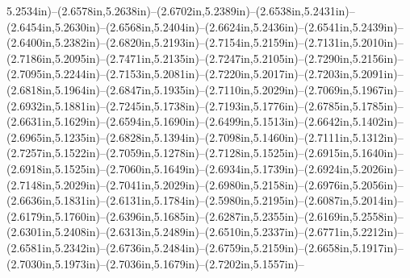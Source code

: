 5.2534in)--(2.6578in,5.2638in)--(2.6702in,5.2389in)--(2.6538in,5.2431in)--(2.6454in,5.2630in)--(2.6568in,5.2404in)--(2.6624in,5.2436in)--(2.6541in,5.2439in)--(2.6400in,5.2382in)--(2.6820in,5.2193in)--(2.7154in,5.2159in)--(2.7131in,5.2010in)--(2.7186in,5.2095in)--(2.7471in,5.2135in)--(2.7247in,5.2105in)--(2.7290in,5.2156in)--(2.7095in,5.2244in)--(2.7153in,5.2081in)--(2.7220in,5.2017in)--(2.7203in,5.2091in)--(2.6818in,5.1964in)--(2.6847in,5.1935in)--(2.7110in,5.2029in)--(2.7069in,5.1967in)--(2.6932in,5.1881in)--(2.7245in,5.1738in)--(2.7193in,5.1776in)--(2.6785in,5.1785in)--(2.6631in,5.1629in)--(2.6594in,5.1690in)--(2.6499in,5.1513in)--(2.6642in,5.1402in)--(2.6965in,5.1235in)--(2.6828in,5.1394in)--(2.7098in,5.1460in)--(2.7111in,5.1312in)--(2.7257in,5.1522in)--(2.7059in,5.1278in)--(2.7128in,5.1525in)--(2.6915in,5.1640in)--(2.6918in,5.1525in)--(2.7060in,5.1649in)--(2.6934in,5.1739in)--(2.6924in,5.2026in)--(2.7148in,5.2029in)--(2.7041in,5.2029in)--(2.6980in,5.2158in)--(2.6976in,5.2056in)--(2.6636in,5.1831in)--(2.6131in,5.1784in)--(2.5980in,5.2195in)--(2.6087in,5.2014in)--(2.6179in,5.1760in)--(2.6396in,5.1685in)--(2.6287in,5.2355in)--(2.6169in,5.2558in)--(2.6301in,5.2408in)--(2.6313in,5.2489in)--(2.6510in,5.2337in)--(2.6771in,5.2212in)--(2.6581in,5.2342in)--(2.6736in,5.2484in)--(2.6759in,5.2159in)--(2.6658in,5.1917in)--(2.7030in,5.1973in)--(2.7036in,5.1679in)--(2.7202in,5.1557in)--

